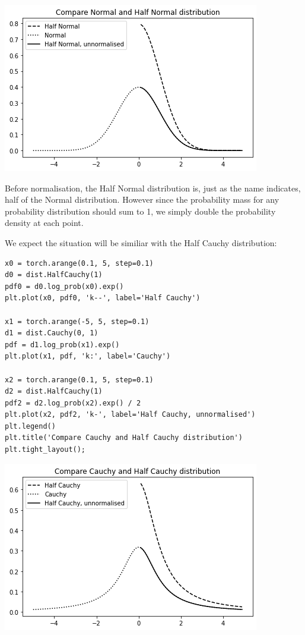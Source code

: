 \documentclass[11pt]{article}
\begin{document}
\begin{center}
\includegraphics[width=.9\linewidth]{./.ob-jupyter/e79ea18b3b121c1d5e2c60e3f686534e3507d19c.png}
\end{center}


Before normalisation, the Half Normal distribution is, just as the name indicates, half of the Normal distribution. However since the probability mass for any probability distribution should sum to 1, we simply double the probability density at each point.

We expect the situation will be similiar with the Half Cauchy distribution:

\begin{verbatim}
x0 = torch.arange(0.1, 5, step=0.1)
d0 = dist.HalfCauchy(1)
pdf0 = d0.log_prob(x0).exp()
plt.plot(x0, pdf0, 'k--', label='Half Cauchy')

x1 = torch.arange(-5, 5, step=0.1)
d1 = dist.Cauchy(0, 1)
pdf = d1.log_prob(x1).exp()
plt.plot(x1, pdf, 'k:', label='Cauchy')

x2 = torch.arange(0.1, 5, step=0.1)
d2 = dist.HalfCauchy(1)
pdf2 = d2.log_prob(x2).exp() / 2
plt.plot(x2, pdf2, 'k-', label='Half Cauchy, unnormalised')
plt.legend()
plt.title('Compare Cauchy and Half Cauchy distribution')
plt.tight_layout();
\end{verbatim}

\begin{center}
\includegraphics[width=.9\linewidth]{./.ob-jupyter/9261b5c1d61cb1e776c0d3f3bc040ab5922c2f00.png}
\end{center}
\end{document}
